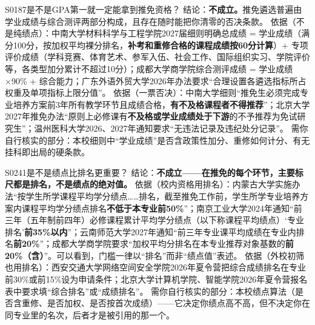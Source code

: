 \begin{qa}{S0187}{是不是GPA第一就一定能拿到推免资格？}
结论：\textbf{不成立。}推免遴选普遍由学业成绩与综合测评两部分构成，且存在随时能把你清零的否决条款。
依据（不是纯绩点）：中南大学材料科学与工程学院2027届细则明确总成绩 = 学业成绩（满分100分，按加权平均裸分排名，\textbf{补考和重修合格的课程成绩按60分计算}）+ 专项评价成绩（学科竞赛、体育艺术、参军入伍、社会工作、国际组织实习、学院评价等，各类型加分累计不超过10分）；成都大学商学院综合测评成绩 = 学业成绩×90\% + 综合能力；广东外语外贸大学2026年办法要求“合理设置各遴选指标所占权重及单项指标上限分值”。
依据（一票否决）：中南大学细则“推免生必须完成专业培养方案前3年所有教学环节且成绩合格，\textbf{有不及格课程者不得推荐}”；北京大学2027年推免办法“原则上必修课有\textbf{不及格或学业成绩处于下游}的不予推荐为免试研究生”；温州医科大学2026、2027年通知要求“无违法记录及违纪处分记录”。
需你自行核实的部分：本校细则中“学业成绩”是否含政策性加分、重修如何计分、有无挂科即出局的硬条款。
\end{qa}

\begin{qa}{S0241}{是不是绩点比排名更重要？}
结论：\textbf{不成立——在推免的每个环节，主要标尺都是排名，不是绩点的绝对值。}
依据（校内资格用排名）：内蒙古大学实施办法“按学生所学课程平均学分绩点……排名，截至推免工作前，学生所学专业培养方案内课程平均学分绩点排名\textbf{不低于本专业前50\%}”；南京工业大学2024年通知“前三年（五年制前四年）必修课程累计平均学分绩点（以下称课程平均绩点）‘专业排名’\textbf{前35\%以内}”；云南师范大学2027年通知“前三年专业课平均成绩在专业内排名\textbf{前20\%}”；成都大学商学院要求“加权平均分排名在本专业推荐对象基数的\textbf{前20\%（含）}”。可以看到，门槛一律以“排名”而非“绩点值”表述。
依据（外校初筛也用排名）：西安交通大学网络空间安全学院2026年夏令营把综合成绩排名在专业前30\%或前15\%设为申请条件；北京大学计算机学院、智能学院2026年夏令营报名表中要求填“综合排名”或“成绩排名”。
需你自行核实的部分：本校绩点算法（是否含重修、是否加权、是否按首次成绩）——它决定你绩点高不高，但不决定你在同专业里的名次，后者才是被引用的那一个。
\end{qa}

